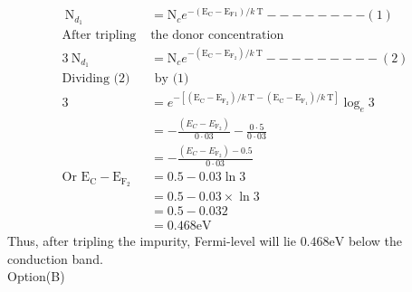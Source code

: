 \begin{enumerate}
\begin{answer}
$$\begin{aligned}
 	\mathrm{~N}_{d_{1}} &=\mathrm{N}_{c} e^{-\left(\mathrm{E}_{\mathrm{C}}-\mathrm{E}_{\mathrm{F} 1}\right) / k \mathrm{~T}} --------(1)\\
 	\text{After tripling }&\text{the donor concentration}\\
 	3\mathrm{~N}_{d_{1}}&=\mathrm{N}_{c}e^{-\left(\mathrm{E}_{\mathrm{C}}-\mathrm{E}_{\mathrm{F}_{2}}\right) / k \mathrm{~T}}---------(2)\\
 	\text{Dividing (2)}&\text{ by (1)}\\
 	3&=e^{-\left[\left(\mathrm{E}_{\mathrm{C}}-\mathrm{E}_{\mathrm{F}_{2}}\right) / k \mathrm{~T}-\left(\mathrm{E}_{\mathrm{C}}-\mathrm{E}_{\mathrm{F}_{1}}\right) / k \mathrm{~T}\right]}
 	\log _{e} 3\\ &=-\frac{\left(E_{C}-E_{\mathrm{F}_{2}}\right)}{0 \cdot 03}-\frac{0 \cdot 5}{0 \cdot 03} \\
 	&=-\frac{\left(E_{C}-E_{\mathrm{F}_{2}}\right)-0.5}{0 \cdot 03}\\
 	\text{Or }
 	\mathrm{E}_{\mathrm{C}}-\mathrm{E}_{\mathrm{F}_{2}} &=0.5-0.03 \ln 3 \\
 	&=0.5-0.03 \times \ln 3 \\
 	&=0.5-0.032 \\
 	&=0.468 \mathrm{eV}
 	\end{aligned}
 	$$
 	Thus, after tripling the impurity, Fermi-level will lie $0.468 \mathrm{eV}$ below the conduction band.\\
 	Option(B)
 \end{answer}


\end{enumerate}
